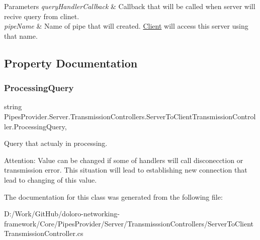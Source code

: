 \begin{DoxyParams}{Parameters}
{\em query\+Handler\+Callback} & Callback that will be called when server will recive query from clinet.\\
\hline
{\em pipe\+Name} & Name of pipe that will created. \mbox{\hyperlink{namespace_pipes_provider_1_1_client}{Client}} will access this server using that name.\\
\hline
\end{DoxyParams}


\subsection{Property Documentation}
\mbox{\label{class_pipes_provider_1_1_server_1_1_transmission_controllers_1_1_server_to_client_transmission_controller_abc1b9e3483f9e0f1fd83e72d9b87377d}} 
\subsubsection{\texorpdfstring{Processing\+Query}{ProcessingQuery}}
{\footnotesize\ttfamily string Pipes\+Provider.\+Server.\+Transmission\+Controllers.\+Server\+To\+Client\+Transmission\+Controller.\+Processing\+Query\hspace{0.3cm}{\ttfamily [get]}, {\ttfamily [set]}}



Query that actualy in processing. 

Attention\+: Value can be changed if some of handlers will call disconecction or transmission error. This situation will lead to establishing new connection that lead to changing of this value. 

The documentation for this class was generated from the following file\+:\begin{DoxyCompactItemize}
\item 
D\+:/\+Work/\+Git\+Hub/doloro-\/networking-\/framework/\+Core/\+Pipes\+Provider/\+Server/\+Transmisssion\+Controllers/Server\+To\+Client\+Transmission\+Controller.\+cs\end{DoxyCompactItemize}
